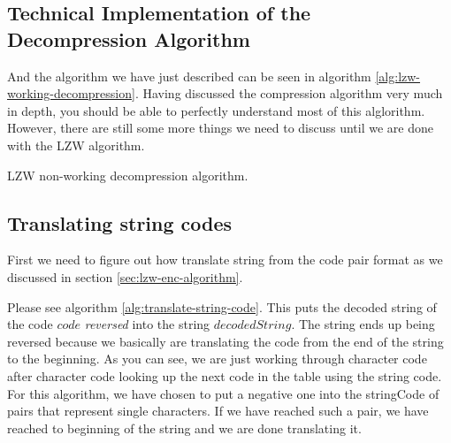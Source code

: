 \begin{refsection}
\section{Technical Implementation of the Decompression Algorithm}

And the algorithm we have just described can be seen in algorithm
\ref{alg:lzw-working-decompression}. Having discussed the
compression algorithm very much in depth, you should be able to
perfectly understand most of this alglorithm. However, there are still
some more things we need to discuss until we are done with the LZW
algorithm.

\begin{algorithm}[H]
  \caption{LZW non-working decompression algorithm.}
  \label{alg:lzw-working-decompression}
  \begin{algorithmic}[1]
    \State {}



       
      \Else
      \EndIf

      \State {}

       

      \State {}



    \EndWhile
  \end{algorithmic}
\end{algorithm}

\subsection{Translating string codes}

First we need to figure out how translate string from the code pair format as we
discussed in section \ref{sec:lzw-enc-algorithm}.

Please see algorithm \ref{alg:translate-string-code}. This puts the
decoded string of the code $code$ \textit{reversed} into the string
$decodedString$. The string ends up being reversed because we
basically are translating the code from the end of the string to the
beginning. As you can see, we are just working through character code
after character code looking up the next code in the table using the
string code. For this algorithm, we have chosen to put a negative one
into the stringCode of pairs that represent single characters. If we
have reached such a pair, we have reached to beginning of the string
and we are done translating it.


\end{refsection}
